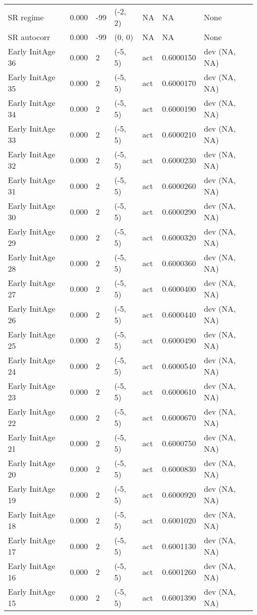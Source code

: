 \documentclass[11pt,
  english,
  letterpaper,
]{article}
\begin{document}
\begin{landscape}
\begin{longtable}[t]{>{\raggedright\arraybackslash}p{7cm}lllll>{\raggedright\arraybackslash}p{4cm}}
SR regime & 0.000 & -99 & (-2, 2) & NA & NA & None\\
SR autocorr & 0.000 & -99 & (0, 0) & NA & NA & None\\
Early InitAge 36 & 0.000 & 2 & (-5, 5) & act & 0.6000150 & dev (NA, NA)\\
Early InitAge 35 & 0.000 & 2 & (-5, 5) & act & 0.6000170 & dev (NA, NA)\\
Early InitAge 34 & 0.000 & 2 & (-5, 5) & act & 0.6000190 & dev (NA, NA)\\
Early InitAge 33 & 0.000 & 2 & (-5, 5) & act & 0.6000210 & dev (NA, NA)\\
Early InitAge 32 & 0.000 & 2 & (-5, 5) & act & 0.6000230 & dev (NA, NA)\\
Early InitAge 31 & 0.000 & 2 & (-5, 5) & act & 0.6000260 & dev (NA, NA)\\
Early InitAge 30 & 0.000 & 2 & (-5, 5) & act & 0.6000290 & dev (NA, NA)\\
Early InitAge 29 & 0.000 & 2 & (-5, 5) & act & 0.6000320 & dev (NA, NA)\\
Early InitAge 28 & 0.000 & 2 & (-5, 5) & act & 0.6000360 & dev (NA, NA)\\
Early InitAge 27 & 0.000 & 2 & (-5, 5) & act & 0.6000400 & dev (NA, NA)\\
Early InitAge 26 & 0.000 & 2 & (-5, 5) & act & 0.6000440 & dev (NA, NA)\\
Early InitAge 25 & 0.000 & 2 & (-5, 5) & act & 0.6000490 & dev (NA, NA)\\
Early InitAge 24 & 0.000 & 2 & (-5, 5) & act & 0.6000540 & dev (NA, NA)\\
Early InitAge 23 & 0.000 & 2 & (-5, 5) & act & 0.6000610 & dev (NA, NA)\\
Early InitAge 22 & 0.000 & 2 & (-5, 5) & act & 0.6000670 & dev (NA, NA)\\
Early InitAge 21 & 0.000 & 2 & (-5, 5) & act & 0.6000750 & dev (NA, NA)\\
Early InitAge 20 & 0.000 & 2 & (-5, 5) & act & 0.6000830 & dev (NA, NA)\\
Early InitAge 19 & 0.000 & 2 & (-5, 5) & act & 0.6000920 & dev (NA, NA)\\
Early InitAge 18 & 0.000 & 2 & (-5, 5) & act & 0.6001020 & dev (NA, NA)\\
Early InitAge 17 & 0.000 & 2 & (-5, 5) & act & 0.6001130 & dev (NA, NA)\\
Early InitAge 16 & 0.000 & 2 & (-5, 5) & act & 0.6001260 & dev (NA, NA)\\
Early InitAge 15 & 0.000 & 2 & (-5, 5) & act & 0.6001390 & dev (NA, NA)\\

\end{longtable}
\end{landscape}
\end{document}
